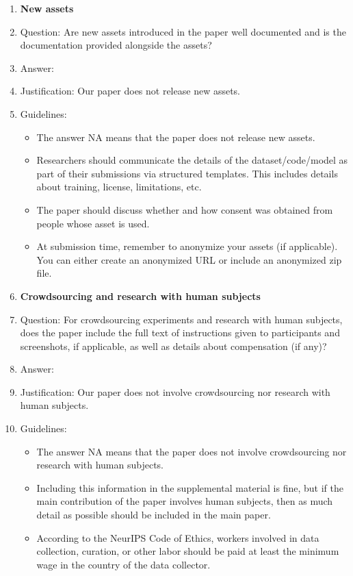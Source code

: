 \documentclass{article}
\theoremstyle{plain}
\theoremstyle{definition}
\theoremstyle{remark}
\begin{document}
\begin{enumerate}
\item {\bf New assets}
    \item[] Question: Are new assets introduced in the paper well documented and is the documentation provided alongside the assets?
    \item[] Answer: \answerNA{} %
    \item[] Justification: Our paper does not release new assets.
    \item[] Guidelines:
    \begin{itemize}
        \item The answer NA means that the paper does not release new assets.
        \item Researchers should communicate the details of the dataset/code/model as part of their submissions via structured templates. This includes details about training, license, limitations, etc. 
        \item The paper should discuss whether and how consent was obtained from people whose asset is used.
        \item At submission time, remember to anonymize your assets (if applicable). You can either create an anonymized URL or include an anonymized zip file.
    \end{itemize}

\item {\bf Crowdsourcing and research with human subjects}
    \item[] Question: For crowdsourcing experiments and research with human subjects, does the paper include the full text of instructions given to participants and screenshots, if applicable, as well as details about compensation (if any)? 
    \item[] Answer: \answerNA{} %
    \item[] Justification: Our paper does not involve crowdsourcing nor research with human subjects.
    \item[] Guidelines:
    \begin{itemize}
        \item The answer NA means that the paper does not involve crowdsourcing nor research with human subjects.
        \item Including this information in the supplemental material is fine, but if the main contribution of the paper involves human subjects, then as much detail as possible should be included in the main paper. 
        \item According to the NeurIPS Code of Ethics, workers involved in data collection, curation, or other labor should be paid at least the minimum wage in the country of the data collector. 
    \end{itemize}


\end{enumerate}
\end{document}
